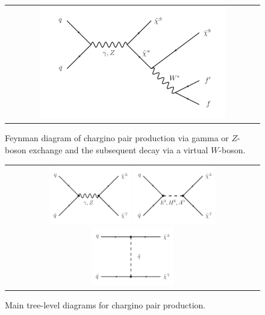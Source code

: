 \begin{figure}[!t]
  \centering 
  \begin{tabular}{c}
    \includegraphics[width=0.75\textwidth]{figures/analysis/ChiChi_ProductionAndDecay.pdf}
  \end{tabular}
  \caption{Feynman diagram of chargino pair production via gamma or $Z$-boson exchange and the subsequent decay via a virtual $W$-boson.}
  \label{fig:FeynmanDiagram}
\end{figure}
\begin{figure}[!b]
  \centering 
  \begin{tabular}{c}
    \includegraphics[width=0.33\textwidth]{figures/analysis/ChiChi_GammaZ.pdf}
    \includegraphics[width=0.33\textwidth]{figures/analysis/ChiChi_Scalar.pdf}
    \includegraphics[width=0.33\textwidth]{figures/analysis/ChiChi_Squark.pdf}
  \end{tabular}
  \caption{Main tree-level diagrams for chargino pair production.}
  \label{fig:FeynmanDiagramProductionCharginoPair}
\end{figure}

